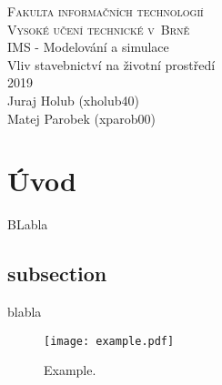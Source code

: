 \documentclass[a4paper, 11pt]{article}
\begin{document}
\begin{titlepage}
	\begin{center}
		\Huge
		\textsc{Fakulta informačních technologií \\
			Vysoké učení technické v~Brně} \\
		{\LARGE
			IMS - Modelování a simulace \\ 
			\medskip \Large{Vliv stavebnictví na životní prostředí}
			}
		\setlength{\parindent}{0.3em}\\
		{\Large 2019} \\
		{\Large Juraj Holub (xholub40)}\\
		{\Large Matej Parobek (xparob00)}
	\end{center}
\end{titlepage}

\tableofcontents
\newpage

\section{Úvod}
BLabla

\subsection{subsection}
blabla\cite{RFC3912}

\begin{figure}[H] 
	\centering
	\texttt{[image: example.pdf]}
	\caption{Example.}
	\label{obr1}
\end{figure} \label{obr_tcp_syn}

\newpage


\end{document}
